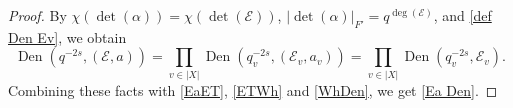 \documentclass[reqno]{amsart}
\numberwithin{equation}{section}
\newcommand{\sL}{\ensuremath{\mathscr{L}}\xspace}
\DeclareMathOperator{\ord}{ord}
\DeclareMathOperator{\Herm}{Herm}
\DeclareMathOperator{\Den}{Den}
\newcommand{\Yundel}[1]{{\color{green} Delete: {#1}}}
\newcommand{\s}{\sigma}
\newcommand\cE{\mathcal{E}}
\newcommand\cO{\mathcal{O}}
\theoremstyle{remark}
\numberwithin{equation}{section}
\begin{document}
\begin{proof}
By $\chi(\det(\alpha))=\chi(\det(\cE))$, $|\det (\alpha)|_{F'}=q^{\deg(\cE)}$, and \eqref{def Den Ev}, we obtain
\begin{equation*}
\Den(q^{-2s}, (\cE,a))=\prod_{v\in |X|}\Den(q^{-2s}_{v}, (\cE_{v},a_{v}))=\prod_{v\in |X|}\Den(q_v^{-2s},  \cE_{v}).
\end{equation*}
Combining these facts with \eqref{EaET}, \eqref{ETWh} and \eqref{WhDen}, we get \eqref{Ea Den}.


%



\end{proof}
\end{document}
